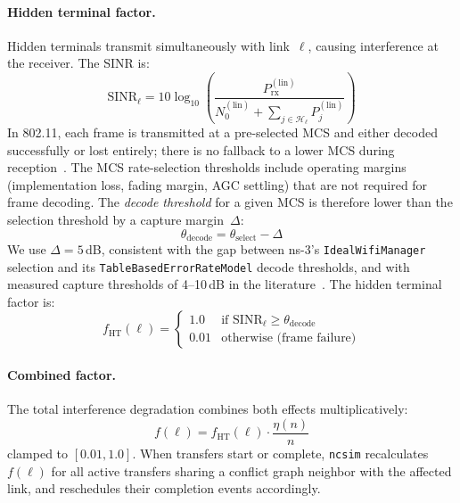 \documentclass[conference]{IEEEtran}
\newcommand{\ncsim}{\texttt{ncsim}}
\begin{document}
\paragraph{Hidden terminal factor.}
Hidden terminals transmit simultaneously with link~$\ell$, causing
interference at the receiver.  The SINR is:
\begin{equation}
\text{SINR}_\ell = 10\log_{10}\!\left(\frac{P_\text{rx}^{(\text{lin})}}{N_0^{(\text{lin})} + \sum_{j \in \mathcal{H}_\ell} P_j^{(\text{lin})}}\right)
\label{eq:sinr}
\end{equation}
In 802.11, each frame is transmitted at a pre-selected MCS and either
decoded successfully or lost entirely; there is no fallback to a lower
MCS during reception~\cite{daneshgaran2008,zorzi1994}.  The MCS
rate-selection thresholds include operating margins (implementation loss,
fading margin, AGC settling) that are not required for frame decoding.
The \emph{decode threshold} for a given MCS is therefore lower than the
selection threshold by a capture margin~$\Delta$:
\begin{equation}
\theta_\text{decode} = \theta_\text{select} - \Delta
\label{eq:capture}
\end{equation}
We use $\Delta = 5$\,dB, consistent with the gap between ns-3's
\texttt{IdealWifiManager} selection and its \texttt{TableBasedErrorRateModel}
decode thresholds, and with measured capture thresholds of 4--10\,dB in the
literature~\cite{hadzivelkov2002}.  The hidden terminal factor is:
\begin{equation}
f_\text{HT}(\ell) = \begin{cases}
1.0 & \text{if } \text{SINR}_\ell \geq \theta_\text{decode} \\
0.01 & \text{otherwise (frame failure)}
\end{cases}
\label{eq:sinr_factor}
\end{equation}

\paragraph{Combined factor.}
The total interference degradation combines both effects multiplicatively:
\begin{equation}
\boxed{f(\ell) = f_\text{HT}(\ell) \cdot \frac{\eta(n)}{n}}
\label{eq:combined}
\end{equation}
clamped to $[0.01, 1.0]$.  When transfers start or complete, \ncsim{}
recalculates $f(\ell)$ for all active transfers sharing a conflict graph
neighbor with the affected link, and reschedules their completion events
accordingly.
\end{document}
